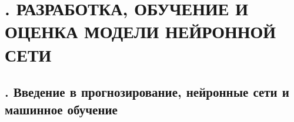 \setcounter{chaptercntr}{4}


\sectionbreak \section*{
  \gostTitleFont
  \redline
  \thechaptercntr .
   РАЗРАБОТКА, ОБУЧЕНИЕ И ОЦЕНКА МОДЕЛИ НЕЙРОННОЙ СЕТИ
}

\subtitlespace

\subsection*{ 
	\gostTitleFont
	\redline
	\thechaptercntr .\thesubchaptercntr \spc
	Введение в прогнозирование, нейронные сети и машинное обучение
} \addtocounter{subchaptercntr}{1}

\titlespace

